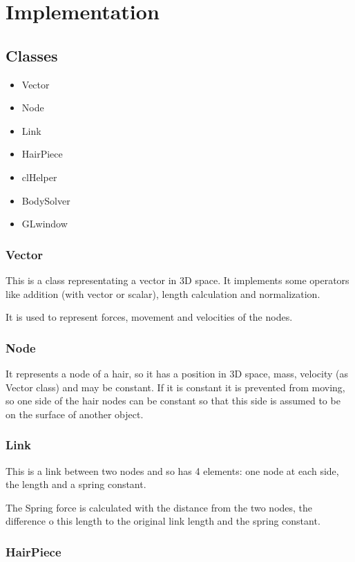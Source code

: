 \documentclass[11pt,a4paper]{scrartcl}
\begin{document}
\section{Implementation}
\subsection{Classes}
\begin{itemize}
	\item Vector
	\item Node
	\item Link
	\item HairPiece
	\item clHelper
	\item BodySolver
	\item GLwindow
\end{itemize}

\subsubsection{Vector}
This is a class representating a vector in 3D space. It implements some operators like addition (with vector or scalar), length calculation and normalization.

It is used to represent forces, movement and velocities of the nodes.

\subsubsection{Node}
It represents a node of a hair, so it has a position in 3D space, mass, velocity (as Vector class) and may be constant. If it is constant it is prevented from moving, so one side of the hair nodes can be constant so that this side is assumed to be on the surface of another object.

\subsubsection{Link}
This is a link between two nodes and so has 4 elements: one node at each side, the length and a spring constant.

The Spring force is calculated with the distance from the two nodes, the difference o this length to the original link length and the spring constant.

\subsubsection{HairPiece}
\end{document}
